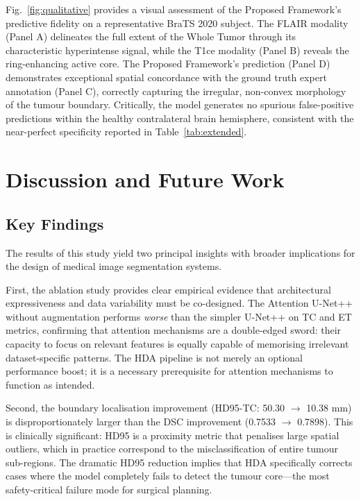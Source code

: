 \documentclass[conference]{IEEEtran}
\begin{document}
Fig.~\ref{fig:qualitative} provides a visual assessment of the Proposed Framework's predictive fidelity on a representative BraTS 2020 subject. The FLAIR modality (Panel A) delineates the full extent of the Whole Tumor through its characteristic hyperintense signal, while the T1ce modality (Panel B) reveals the ring-enhancing active core. The Proposed Framework's prediction (Panel D) demonstrates exceptional spatial concordance with the ground truth expert annotation (Panel C), correctly capturing the irregular, non-convex morphology of the tumour boundary. Critically, the model generates no spurious false-positive predictions within the healthy contralateral brain hemisphere, consistent with the near-perfect specificity reported in Table~\ref{tab:extended}.

\section{Discussion and Future Work}
\label{sec:discussion}

\subsection{Key Findings}
The results of this study yield two principal insights with broader implications for the design of medical image segmentation systems.

First, the ablation study provides clear empirical evidence that architectural expressiveness and data variability must be co-designed. The Attention U-Net++ without augmentation performs \textit{worse} than the simpler U-Net++ on TC and ET metrics, confirming that attention mechanisms are a double-edged sword: their capacity to focus on relevant features is equally capable of memorising irrelevant dataset-specific patterns. The HDA pipeline is not merely an optional performance boost; it is a necessary prerequisite for attention mechanisms to function as intended.

Second, the boundary localisation improvement (HD95-TC: 50.30 $\rightarrow$ 10.38 mm) is disproportionately larger than the DSC improvement (0.7533 $\rightarrow$ 0.7898). This is clinically significant: HD95 is a proximity metric that penalises large spatial outliers, which in practice correspond to the misclassification of entire tumour sub-regions. The dramatic HD95 reduction implies that HDA specifically corrects cases where the model completely fails to detect the tumour core—the most safety-critical failure mode for surgical planning.
\end{document}
